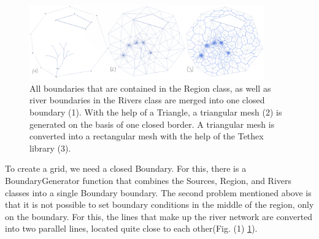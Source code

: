 \documentclass[]{pracamgr}
\begin{document}
      \begin{figure}[H]
        \centering
        \includegraphics[width=0.9\textwidth]{figs/mesh_generation.jpg}        
        \caption{All boundaries that are contained in the Region class, as well as river boundaries in the Rivers class are merged into one closed boundary (1). With the help of a Triangle, a triangular mesh (2) is generated on the basis of one closed border. A triangular mesh is converted into a rectangular mesh with the help of the Tethex library (3).}
        \label{mesh_generation}
      \end{figure}

      To create a grid, we need a closed Boundary. For this, there is a BoundaryGenerator function that combines the Sources, Region, and Rivers classes into a single Boundary boundary. The second problem mentioned above is that it is not possible to set boundary conditions in the middle of the region, only on the boundary. For this, the lines that make up the river network are converted into two parallel lines, located quite close to each other(Fig. (1) \ref{mesh_generation}).
\end{document}
